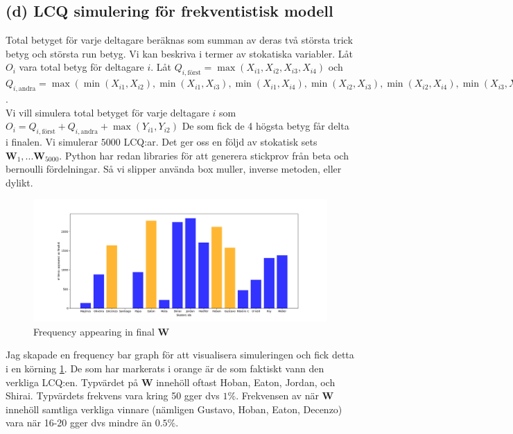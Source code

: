 \documentclass{assignment}
\begin{document}
\subsection*{(d) LCQ simulering för frekventistisk modell}

Total betyget för varje deltagare beräknas som summan av deras två största trick betyg och största run betyg. Vi
kan beskriva i termer av stokatiska variabler. Låt $O_i$ vara total betyg för deltagare $i$.
Låt $Q_{i,\text{först}}=\max(X_{i1},X_{i2},X_{i3},X_{i4})$ och 
\\$Q_{i,\text{andra}}=\max(\min(X_{i1}, X_{i2}), \min(X_{i1}, X_{i3}), \min(X_{i1}, X_{i4}), \min(X_{i2}, X_{i3}), \min(X_{i2}, X_{i4}), \min(X_{i3}, X_{i4}))$.
\\Vi vill simulera total betyget för varje deltagare $i$ som $O_i=Q_{i,\text{först}}+Q_{i,\text{andra}}+\max(Y_{i1},Y_{i2})$
De som fick de 4 högsta betyg får delta i finalen. Vi simulerar $5000$ LCQ:ar. Det ger oss en följd av stokatisk sets $\mathbf{W}_1,...\mathbf{W}_{5000}$.
Python har redan libraries för att generera stickprov från beta och bernoulli fördelningar. Så vi slipper 
använda box muller, inverse metoden, eller dylikt. 
\begin{figure}
    \caption{Frequency appearing in final $\mathbf{W}$}
    \begin{center}
        \includegraphics[width = 200mm]{assets/freq_bar_graph.png} 
    \end{center}
    \label{Histogram 2}
\end{figure}
Jag skapade en frequency bar graph för att visualisera simuleringen och fick detta i en körning \cref{Histogram 2}.
De som har markerats i orange är de som faktiskt vann den verkliga LCQ:en.
Typvärdet på $\mathbf{W}$ innehöll oftast Hoban, Eaton, Jordan, och Shirai. Typvärdets frekvens vara kring 50 gger dvs $1\%$. 
Frekvensen av när $\mathbf{W}$ innehöll samtliga verkliga vinnare (nämligen Gustavo, Hoban, Eaton, Decenzo) vara när 16-20 gger dvs mindre än $0.5\%$.  
\end{document}
